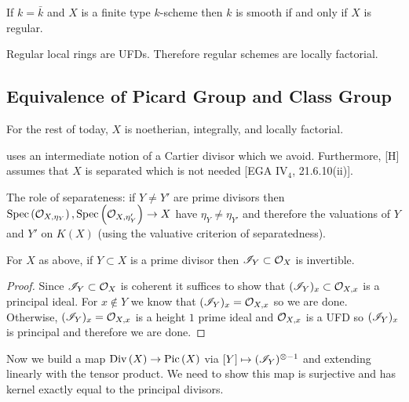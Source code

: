 \documentclass[12pt]{article}
\begin{document}
\begin{example}
If $k = \bar{k}$ and $X$ is a finite type $k$-scheme then $k$ is smooth if and only if $X$ is regular.
\end{example}

\begin{thm}
Regular local rings are UFDs. Therefore regular schemes are locally factorial.
\end{thm}

\subsection{Equivalence of Picard Group and Class Group}

For the rest of today, $X$ is noetherian, integrally, and locally factorial. 

\begin{rmk}
[H] uses an intermediate notion of a Cartier divisor which we avoid. Furthermore, [H] assumes that $X$ is separated which is not needed [EGA IV$_4$, 21.6.10(ii)]. 
\end{rmk}

\begin{rmk}
The role of separateness: if $Y \neq Y'$ are prime divisors then $\mathrm{Spec}\left( \mathcal{O}_{X, \eta_Y} \right), \mathrm{Spec}\left( \mathcal{O}_{X, \eta_Y'} \right) \to X$ have $\eta_Y \neq \eta_{Y'}$ and therefore the valuations of $Y$ and $Y'$ on $K(X)$ (using the valuative criterion of separatedness).
\end{rmk}

\begin{prop}
For $X$ as above, if $Y \subset X$ is a prime divisor then $\mathscr{I}_Y \subset \mathcal{O}_{X}$ is invertible.
\end{prop}

\begin{proof}
Since $\mathscr{I}_Y \subset \mathcal{O}_{X}$ is coherent it suffices to show that $(\mathscr{I}_Y)_x \subset \mathcal{O}_{X, x}$ is a principal ideal. For $x \notin Y$ we know that $(\mathscr{I}_Y)_x = \mathcal{O}_{X, x}$ so we are done. Otherwise, $(\mathscr{I}_Y)_x = \mathcal{O}_{X, x}$ is a height $1$ prime ideal and $\mathcal{O}_{X, x}$ is a UFD so $(\mathscr{I}_Y)_x$ is principal and therefore we are done. 
\end{proof}

\begin{rmk}
Now we build a map $\mathrm{Div}\left( X \right) \to \mathrm{Pic} \left( X \right)$ via $[Y] \mapsto (\mathscr{I}_Y)^{\otimes -1}$ and extending linearly with the tensor product. We need to show this map is surjective and has kernel exactly equal to the principal divisors.
\end{rmk}
\end{document}
